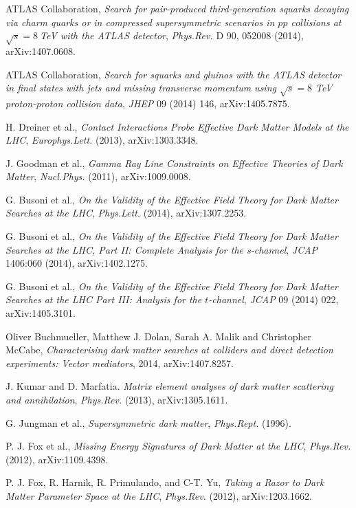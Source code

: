 ATLAS Collaboration, \emph{Search for pair-produced third-generation squarks decaying via charm quarks or in compressed supersymmetric scenarios in $pp$ collisions at $\sqrt{s}=8~$TeV with the ATLAS detector}, \emph{Phys.Rev.} D 90, 052008 (2014), arXiv:1407.0608.

ATLAS Collaboration, \emph{Search for squarks and gluinos with the ATLAS detector in final states with jets and missing transverse momentum using $\sqrt{s}=8$ TeV proton-proton collision data}, \emph{JHEP} 09 (2014) 146, arXiv:1405.7875.

H. Dreiner et al., \emph{Contact Interactions Probe Effective Dark Matter Models at the LHC}, \emph{Europhys.Lett.} (2013), arXiv:1303.3348.

J. Goodman et al., \emph{Gamma Ray Line Constraints on Effective Theories of Dark Matter}, \emph{Nucl.Phys.} (2011), arXiv:1009.0008.

G. Busoni et al., \emph{On the Validity of the Effective Field Theory for Dark Matter Searches at the LHC}, \emph{Phys.Lett.} (2014), arXiv:1307.2253.

G. Busoni et al., \emph{On the Validity of the Effective Field Theory for Dark Matter Searches at the LHC, Part II: Complete Analysis for the s-channel}, \emph{JCAP} 1406:060 (2014), arXiv:1402.1275.

G. Busoni et al., \emph{On the Validity of the Effective Field Theory for Dark Matter Searches at the LHC Part III: Analysis for the $t$-channel}, \emph{JCAP} 09 (2014) 022, arXiv:1405.3101.

Oliver Buchmueller, Matthew J. Dolan, Sarah A. Malik and Christopher McCabe, \emph{Characterising dark matter searches at colliders and direct detection experiments: Vector mediators}, 2014, arXiv:1407.8257.

J. Kumar and D. Marfatia. \emph{Matrix element analyses of dark matter scattering and annihilation}, \emph{Phys.Rev.} (2013), arXiv:1305.1611.

G. Jungman et al., \emph{Supersymmetric dark matter}, \emph{Phys.Rept.} (1996).

P. J. Fox et al., \emph{Missing Energy Signatures of Dark Matter at the LHC}, \emph{Phys.Rev.} (2012), arXiv:1109.4398.

P. J. Fox, R. Harnik, R. Primulando, and C-T. Yu, \emph{Taking a Razor to Dark Matter Parameter Space at the LHC}, \emph{Phys.Rev.} (2012), arXiv:1203.1662.

